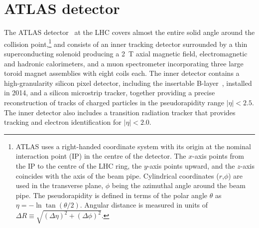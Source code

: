 \documentclass[PAPER, coverpage, atlasdraft=true, texlive=2016, UKenglish]{\ATLASLATEXPATH atlasdoc}
\begin{document}


\section{ATLAS detector}
\label{sec:detector}

The ATLAS detector~\cite{PERF-2007-01} at the LHC covers almost the entire solid angle around the collision point,\footnote{ATLAS 
uses a right-handed coordinate system with its origin at the nominal interaction point (IP) in the 
centre of the detector.  
The $x$-axis points from
the IP to the centre of the LHC ring, %
the $y$-axis points upward,
and the $z$-axis coincides with the axis of the beam pipe.
Cylindrical coordinates ($r$,$\phi$) are used 
in the transverse plane, $\phi$ being the azimuthal angle around the beam pipe. The pseudorapidity is defined in 
terms of the polar angle $\theta$ as $\eta = - \ln \tan(\theta/2)$.
Angular distance is measured in units of $\Delta R\equiv \sqrt{(\Delta\eta)^2+(\Delta\phi)^2}$.} and consists of an inner tracking detector surrounded by a thin superconducting solenoid producing a
2~T axial magnetic field, electromagnetic and hadronic calorimeters, and a muon spectrometer incorporating three large toroid magnet assemblies with eight coils each. The inner detector contains a high-granularity silicon pixel detector, including the %
insertable B-layer~\cite{IBL1,IBL2,Abbott:2018ikt}, installed in 2014, and a silicon microstrip tracker, together providing a precise reconstruction of tracks of charged particles in the pseudorapidity range $|\eta|<2.5$.
The inner detector also includes a transition radiation tracker that provides tracking and electron identification for $|\eta|<2.0$.
\end{document}
